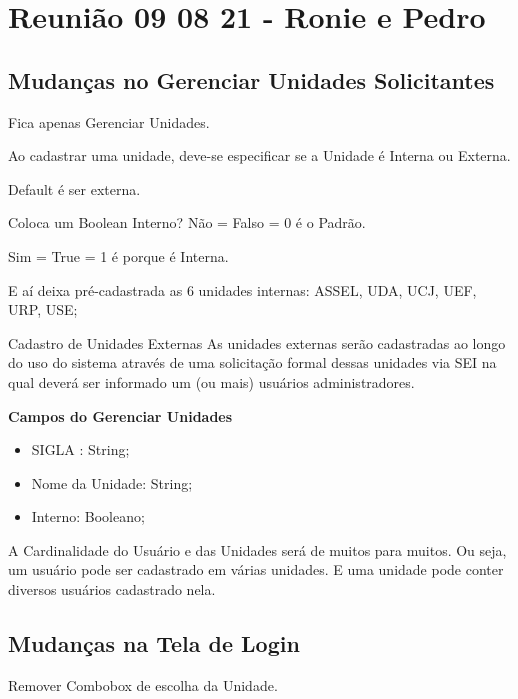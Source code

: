 \section{Reunião 09 08 21 - Ronie e Pedro}

	\subsection{Mudanças no Gerenciar Unidades Solicitantes}
	
	\mssim Fica apenas Gerenciar Unidades.
	
	Ao cadastrar uma unidade, deve-se especificar se a Unidade é Interna ou Externa.

	Default é ser externa.
	
	Coloca um Boolean Interno? Não = Falso = 0 é o Padrão.
	
	Sim = True = 1 é porque é Interna.
	
	E aí deixa pré-cadastrada as 6 unidades internas: ASSEL, UDA, UCJ, UEF, URP, USE; 
		
	\begin{funcionalidade}[1]{Cadastro de Unidades Externas}
		As unidades externas serão cadastradas ao longo do uso do sistema através de uma solicitação formal dessas unidades via SEI na qual deverá ser informado um (ou mais) usuários administradores.
	\end{funcionalidade}
	
	\textbf{Campos do Gerenciar Unidades}
	
	\begin{itemize}
		\item SIGLA : String;
		\item Nome da Unidade: String;		
		\item Interno: Booleano;
	\end{itemize}
	
	A Cardinalidade do Usuário e das Unidades será de muitos para muitos. Ou seja, um usuário pode ser cadastrado em várias unidades.	E uma unidade pode conter diversos usuários cadastrado nela.		

	\subsection{Mudanças na Tela de Login}
	
	\mssim Remover Combobox de escolha da Unidade.

